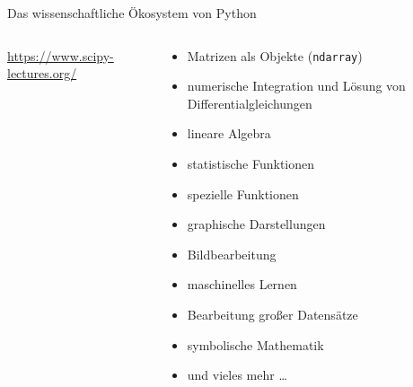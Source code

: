 \documentclass[t, utf8, 10pt]{beamer}
\begin{document}
\begin{frame}{Das wissenschaftliche Ökosystem von Python}
 \begin{columns}
  \begin{column}{0.44\textwidth}

   \begin{footnotesize}
    \url{https://www.scipy-lectures.org/}
   \end{footnotesize}
  \end{column}%
  \begin{column}{0.56\textwidth}
   \begin{small}
    \begin{itemize}
     \setlength{\itemindent}{-10pt}
     \item Matrizen als Objekte (\texttt{ndarray})
     \item numerische Integration und Lösung von Differentialgleichungen
     \item lineare Algebra
     \item statistische Funktionen
     \item spezielle Funktionen
     \item graphische Darstellungen
     \item Bildbearbeitung
     \item maschinelles Lernen
     \item Bearbeitung großer Datensätze
     \item symbolische Mathematik
     \item und vieles mehr \ldots
    \end{itemize}
   \end{small}
  \end{column}
 \end{columns}
\end{frame}
\end{document}
